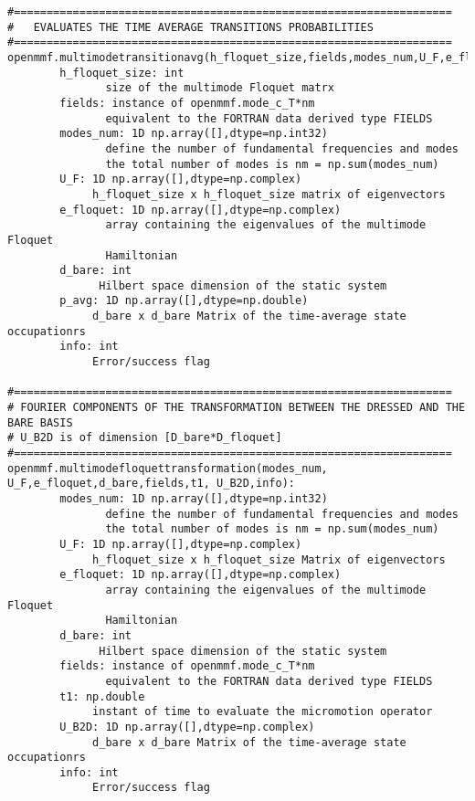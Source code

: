 \documentclass[10pt,a4paper]{article}
\begin{document}
\begin{verbatim}
#===================================================================
#   EVALUATES THE TIME AVERAGE TRANSITIONS PROBABILITIES
#===================================================================
openmmf.multimodetransitionavg(h_floquet_size,fields,modes_num,U_F,e_floquet,d_bare,p_avg,info):
        h_floquet_size: int
               size of the multimode Floquet matrx
        fields: instance of openmmf.mode_c_T*nm 
               equivalent to the FORTRAN data derived type FIELDS
        modes_num: 1D np.array([],dtype=np.int32)
               define the number of fundamental frequencies and modes
               the total number of modes is nm = np.sum(modes_num)
        U_F: 1D np.array([],dtype=np.complex)
             h_floquet_size x h_floquet_size matrix of eigenvectors            
        e_floquet: 1D np.array([],dtype=np.complex)
               array containing the eigenvalues of the multimode Floquet
               Hamiltonian
        d_bare: int
              Hilbert space dimension of the static system
        p_avg: 1D np.array([],dtype=np.double)
             d_bare x d_bare Matrix of the time-average state occupationrs                          
        info: int
             Error/success flag

#===================================================================
# FOURIER COMPONENTS OF THE TRANSFORMATION BETWEEN THE DRESSED AND THE BARE BASIS
# U_B2D is of dimension [D_bare*D_floquet]
#===================================================================
openmmf.multimodefloquettransformation(modes_num, U_F,e_floquet,d_bare,fields,t1, U_B2D,info): 
        modes_num: 1D np.array([],dtype=np.int32)
               define the number of fundamental frequencies and modes
               the total number of modes is nm = np.sum(modes_num)
        U_F: 1D np.array([],dtype=np.complex)
             h_floquet_size x h_floquet_size Matrix of eigenvectors            
        e_floquet: 1D np.array([],dtype=np.complex)
               array containing the eigenvalues of the multimode Floquet
               Hamiltonian
        d_bare: int
              Hilbert space dimension of the static system
        fields: instance of openmmf.mode_c_T*nm 
               equivalent to the FORTRAN data derived type FIELDS
        t1: np.double
             instant of time to evaluate the micromotion operator
        U_B2D: 1D np.array([],dtype=np.complex)
             d_bare x d_bare Matrix of the time-average state occupationrs                          
        info: int
             Error/success flag



\end{verbatim}
\end{document}
